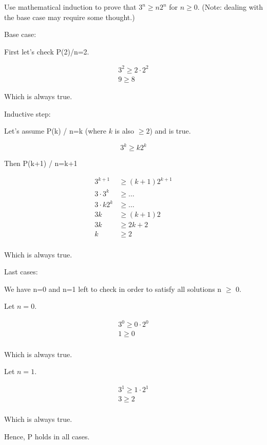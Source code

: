 
\begin{problem}
Use mathematical induction to prove that $3^n \ge n2^n$ for $n\ge 0$. 
(Note: dealing with the base case may require some thought.)
\end{problem}

\begin{solution}
Base case:

First let's check P(2)/n=2.

\begin{gather*}
3^2 \ge 2\cdot2^2 \\
9 \ge 8
\end{gather*}

Which is always true.

\medskip
Inductive step:

Let's assume P(k) / n=k (where $k$ is also $\ge 2$) and is true.

$$3^k \ge k2^k$$

Then P(k+1) / n=k+1

\begin{align*}
3^{k+1} &\ge (k+1)2^{k+1} \\
3\cdot3^k &\ge \ldots   \\
3\cdot k 2^k &\ge \ldots \\
3k &\ge (k+1)2 \\
3k &\ge 2k + 2 \\
k &\ge 2 \\
\end{align*}

Which is always true.

\medskip
Last cases:

We have n=0 and n=1 left to check in order to satisfy all solutions n $\ge$ 0.

Let $n=0$.

\begin{gather*}
3^0 \ge 0\cdot2^0\\
1 \ge 0\\
\end{gather*}

Which is always true.

Let $n=1$.

\begin{gather*}
3^1 \ge 1\cdot2^1\\
3 \ge 2\\
\end{gather*}

Which is always true.

\medskip
Hence, P holds in all cases.

\end{solution}



